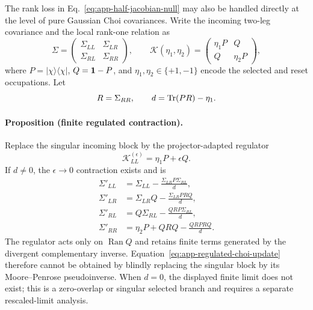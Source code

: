 The rank loss in Eq.~\eqref{eq:app-half-jacobian-null} may also be handled
directly at the level of pure Gaussian Choi covariances.  Write the incoming
two-leg covariance and the local rank-one relation as
\begin{equation}
    \Sigma=
    \begin{pmatrix}
      \Sigma_{LL}&\Sigma_{LR}\\
      \Sigma_{RL}&\Sigma_{RR}
    \end{pmatrix},
    \qquad
    \mathcal K(\eta_1,\eta_2)=
    \begin{pmatrix}
      \eta_1P&Q\\ Q&\eta_2P
    \end{pmatrix},
    \label{eq:app-local-choi-relation}
\end{equation}
where \(P=\lvert\chi\rangle\langle\chi\rvert\), \(Q=\mathbf{1}-P\), and
\(\eta_1,\eta_2\in\{+1,-1\}\) encode the selected and reset occupations.
Let
\begin{equation}
    R=\Sigma_{RR},
    \qquad
    d=\operatorname{Tr}(PR)-\eta_1 .
    \label{eq:app-choi-rank-one-denominator}
\end{equation}

\paragraph*{Proposition (finite regulated contraction).}
Replace the singular incoming block by the projector-adapted regulator
\begin{equation}
    \mathcal K_{LL}^{(\epsilon)}=\eta_1P+\epsilon Q.
    \label{eq:app-projector-adapted-regulator}
\end{equation}
If \(d\neq0\), the \(\epsilon\to0\) contraction exists and is
\begin{equation}
\boxed{
\begin{aligned}
\Sigma'_{LL}
&=\Sigma_{LL}-\frac{\Sigma_{LR}P\Sigma_{RL}}{d},\\
\Sigma'_{LR}
&=\Sigma_{LR}Q-\frac{\Sigma_{LR}PRQ}{d},\\
\Sigma'_{RL}
&=Q\Sigma_{RL}-\frac{QRP\Sigma_{RL}}{d},\\
\Sigma'_{RR}
&=\eta_2P+QRQ-\frac{QRPRQ}{d}.
\end{aligned}}
\label{eq:app-regulated-choi-update}
\end{equation}
The regulator acts only on \(\operatorname{Ran}Q\) and retains finite terms generated by
the divergent complementary inverse.  Equation~\eqref{eq:app-regulated-choi-update}
therefore cannot be obtained by blindly replacing the singular block by its
Moore--Penrose pseudoinverse.  When \(d=0\), the displayed finite limit does
not exist; this is a zero-overlap or singular selected branch and requires a
separate rescaled-limit analysis.

